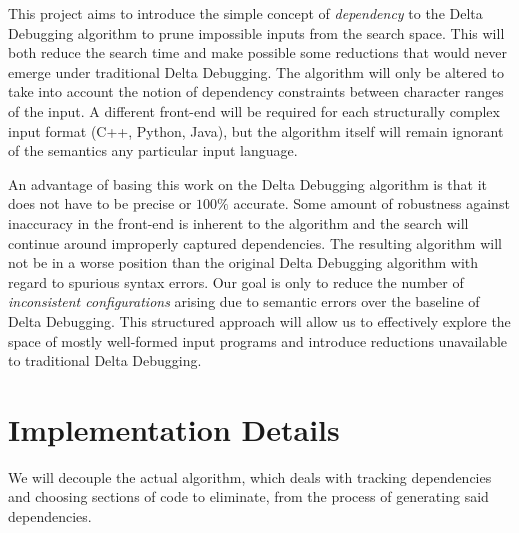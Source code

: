 \documentclass[11pt]{article}
\begin{document}
This project aims to introduce the simple concept of \emph{dependency} to the
Delta Debugging algorithm to prune impossible inputs from the search space.
This will both reduce the search time and make possible some reductions that
would never emerge under traditional Delta Debugging. The algorithm will only be
altered to take into account the notion of dependency constraints between
character ranges of the input. A different front-end will be required for each
structurally complex input format (C++, Python, Java), but the algorithm itself
will remain ignorant of the semantics any particular input language.

An advantage of basing this work on the Delta Debugging algorithm is that it
does not have to be precise or $100 \%$ accurate. Some amount of robustness
against inaccuracy in the front-end is inherent to the algorithm and the search
will continue around improperly captured dependencies.  The resulting algorithm
will not be in a worse position than the original Delta Debugging algorithm with
regard to spurious syntax errors.  Our goal is only to reduce the number of
\emph{inconsistent configurations} \citep{zeller99} arising due to semantic
errors over the baseline of Delta Debugging. This structured approach will allow
us to effectively explore the space of mostly well-formed input programs and
introduce reductions unavailable to traditional Delta Debugging.


\section{Implementation Details}
We will decouple the actual algorithm, which deals with tracking dependencies
and choosing sections of code to eliminate, from the process of generating said
dependencies.
\end{document}
